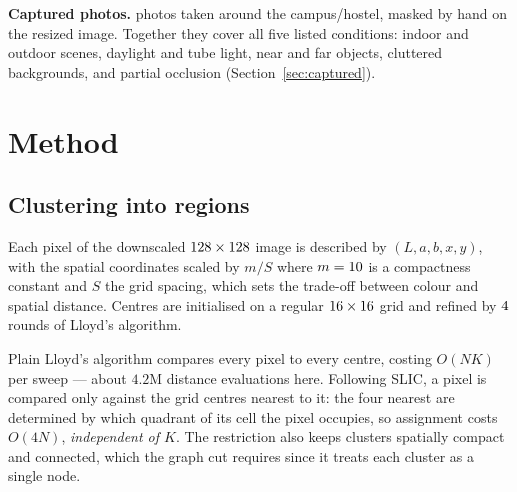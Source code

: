 \documentclass[11pt,a4paper]{article}
\begin{document}
\textbf{Captured photos.} \Ncap{} photos taken around the campus/hostel, masked by hand
on the resized image. Together they cover all five listed conditions: indoor and
outdoor scenes, daylight and tube light, near and far objects, cluttered backgrounds,
and partial occlusion (Section~\ref{sec:captured}).

\section{Method}

\subsection{Clustering into regions}
Each pixel of the downscaled $128\times128$ image is described by
$(L,a,b,x,y)$, with the spatial coordinates scaled by $m/S$ where $m=10$ is a
compactness constant and $S$ the grid spacing, which sets the trade-off between colour
and spatial distance. Centres are initialised on a regular $16\times16$ grid and
refined by $4$ rounds of Lloyd's algorithm.

Plain Lloyd's algorithm compares every pixel to every centre, costing $O(NK)$ per
sweep --- about $4.2$M distance evaluations here. Following SLIC, a pixel is compared
only against the grid centres nearest to it: the four nearest are determined by which
quadrant of its cell the pixel occupies, so assignment costs $O(4N)$, \emph{independent
of $K$}. The restriction also keeps clusters spatially compact and connected, which the
graph cut requires since it treats each cluster as a single node.
\end{document}
